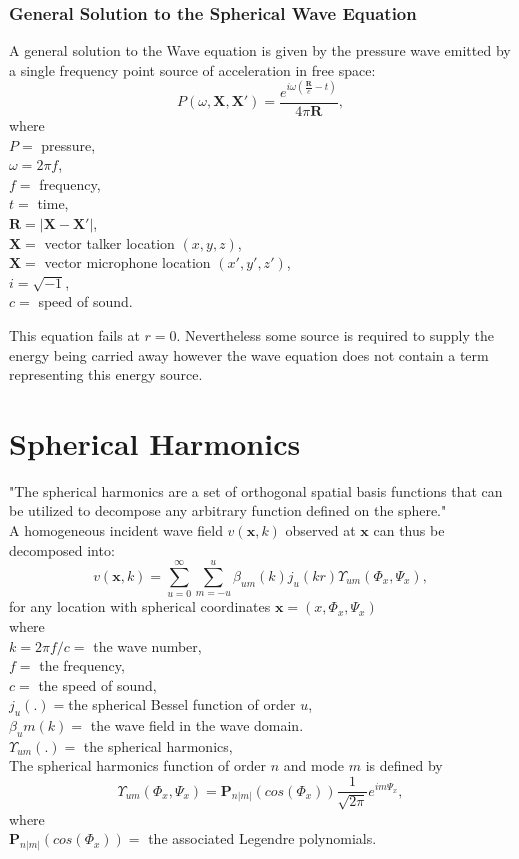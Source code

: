 \subsubsection{General Solution to the Spherical Wave Equation}
A general solution to the Wave equation is given by the pressure wave emitted by a single frequency point source of acceleration in free space\cite{Allen1979}:
\begin{equation}
    P(\omega,\mathbf{X},\mathbf{X'}) = \frac{e^{i\omega(\frac{\mathbf{R}}{c}-t)}}{4\pi \mathbf{R}},
\end{equation}
where\\
$P=$ pressure,\\
$\omega=2\pi f$,\\
$f=$ frequency,\\
$t=$ time,\\
$\mathbf{R}=|\mathbf{X}-\mathbf{X}'|$,\\
$\mathbf{X}=$ vector talker location $(x,y,z)$,\\
$\mathbf{X}=$ vector microphone location $(x',y',z')$,\\
$i=\sqrt{-1}$,\\
$c=$ speed of sound.

This equation fails at $r = 0$. Nevertheless some source is required to supply the energy being carried away however the wave equation does not contain a term representing this energy source.


\section{Spherical Harmonics}
"The spherical harmonics are a set of orthogonal spatial basis functions that can be utilized
to decompose any arbitrary function defined on the sphere."\cite{Samarasinghe2018}\\
A homogeneous incident wave field $v(\mathbf{x},k)$ observed at $\mathbf{x}$ can thus be decomposed into\cite{Zhang2019}:
\begin{equation}
    v(\mathbf{x},k)=\sum_{u=0}^\infty \sum_{m=-u}^u\beta_{um}(k)j_u(kr)\Upsilon_{um}(\Phi_x,\Psi_x),
\end{equation}
for any location with spherical coordinates $\mathbf{x}=(x,\Phi_x,\Psi_x)$\\
where\\
$k=2\pi f/c=$ the wave number,\\
$f=$ the frequency,\\
$c=$ the speed of sound,\\
$j_u(.)=$the spherical Bessel function of order $u$,\\
$\beta_um(k)=$ the wave field in the wave domain.\\ 
$\Upsilon_{um}(.)=$ the spherical harmonics,\\
The spherical harmonics function of order $n$ and mode $m$ is defined by\cite{Samarasinghe2018}
\begin{equation}
    \Upsilon_{um}(\Phi_x,\Psi_x) = \mathbf{P}_{n|m|}(cos(\Phi_x))\frac{1}{\sqrt{2\pi}}e^{im\Psi_x},
\end{equation}
where\\
$\mathbf{P}_{n|m|}(cos(\Phi_x))=$ the associated Legendre polynomials.
